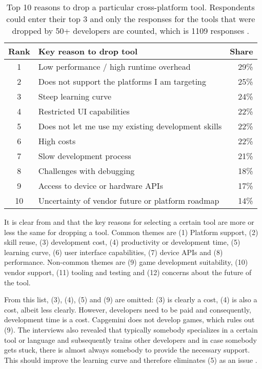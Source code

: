 \begin{table}[h]
    \begin{center}
        \begin{tabular}{clr}
            \hline
            Rank & Key reason to drop tool & Share \\
            \hline
            1  & Low performance / high runtime overhead & 29\% \\
            2  & Does not support the platforms I am targeting & 25\% \\
            3  & Steep learning curve & 24\% \\
            4  & Restricted UI capabilities & 22\% \\
            5  & Does not let me use my existing development skills & 22\% \\
            6  & High costs & 22\% \\
            7  & Slow development process & 21\% \\
            8  & Challenges with debugging & 18\% \\
            9  & Access to device or hardware APIs & 17\% \\
            10 & Uncertainty of vendor future or platform roadmap & 14\% \\
            \hline
        \end{tabular}
        \caption{Top 10 reasons to drop a particular cross-platform tool. Respondents could enter their top 3 and only the responses for the tools that were dropped by 50+ developers are counted, which is 1109 responses \cite{VMCPT:2012}.}
        \label{tab:drop}
    \end{center}
\end{table}

It is clear from  and  that the key reasons for selecting a certain tool are more or less the same for dropping a tool. Common themes are (1) Platform support, (2) skill reuse, (3) development cost, (4) productivity or development time, (5) learning curve, (6) user interface capabilities, (7) device APIs and (8) performance. Non-common themes are (9) game development suitability, (10) vendor support, (11) tooling and testing and (12) concerns about the future of the tool.

From this list, (3), (4), (5) and (9) are omitted: (3) is clearly a cost, (4) is also a cost, albeit less clearly. However, developers need to be paid and consequently, development time is a cost. Capgemini does not develop games, which rules out (9). The interviews also revealed that typically somebody specializes in a certain tool or language and subsequently trains other developers and in case somebody gets stuck, there is almost always somebody to provide the necessary support. This should improve the learning curve and therefore eliminates (5) as an issue . 

